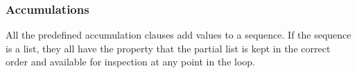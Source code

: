 
\subsubsection{Accumulations}

All the predefined accumulation clauses add values to a sequence.  If
the sequence is a list, they all
have the property that the partial list is kept in the correct order
and available for inspection at any point in the loop.

